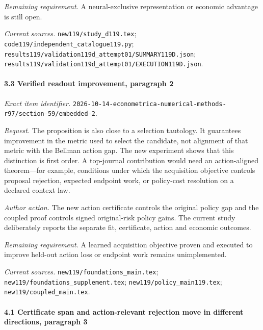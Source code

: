 \par\emph{Remaining requirement.} A neural-exclusive representation or economic advantage is still open.

\par\emph{Current sources.} \nolinkurl{new119/study_d119.tex}; \nolinkurl{code119/independent_catalogue119.py}; \nolinkurl{results119/validation119d_attempt01/SUMMARY119D.json}; \nolinkurl{results119/validation119d_attempt01/EXECUTION119D.json}.

\paragraph{3.3 Verified readout improvement, paragraph 2}

\emph{Exact item identifier.} \nolinkurl{2026-10-14-econometrica-numerical-methods-r97/section-59/embedded-2}.

\par\emph{Request.} The proposition is also close to a selection tautology. It guarantees improvement in the metric used to select the candidate, not alignment of that metric with the Bellman action gap. The new experiment shows that this distinction is first order. A top-journal contribution would need an action-aligned theorem---for example, conditions under which the acquisition objective controls proposal rejection, expected endpoint work, or policy-cost resolution on a declared context law.

\par\emph{Author action.} The new action certificate controls the original policy gap and the coupled proof controls signed original-risk policy gains. The current study deliberately reports the separate fit, certificate, action and economic outcomes.

\par\emph{Remaining requirement.} A learned acquisition objective proven and executed to improve held-out action loss or endpoint work remains unimplemented.

\par\emph{Current sources.} \nolinkurl{new119/foundations_main.tex}; \nolinkurl{new119/foundations_supplement.tex}; \nolinkurl{new119/policy_main119.tex}; \nolinkurl{new119/coupled_main.tex}.

\paragraph{4.1 Certificate span and action-relevant rejection move in different directions, paragraph 3}

